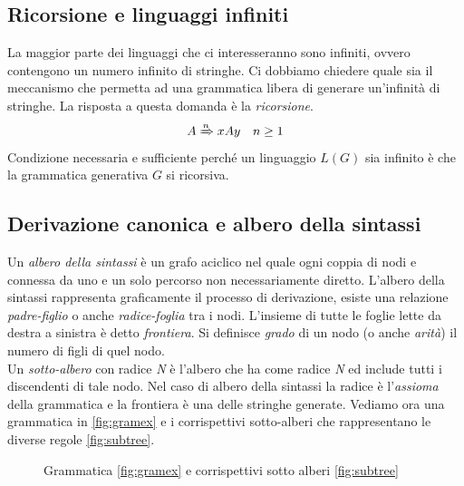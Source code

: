\subsection{Ricorsione e linguaggi infiniti}
La maggior parte dei linguaggi che ci interesseranno sono infiniti, ovvero contengono un numero infinito di stringhe. Ci dobbiamo chiedere quale sia il meccanismo che permetta ad una grammatica libera di generare un'infinità di stringhe. La risposta a questa domanda è la \emph{ricorsione}.
$$A\xRightarrow{n}xAy \quad n\geq 1$$
Condizione necessaria e sufficiente perché un linguaggio $ L(G) $ sia infinito è che la grammatica generativa $ G $ si ricorsiva.
\subsection{Derivazione canonica e albero della sintassi}
Un \emph{albero della sintassi} è un grafo aciclico nel quale ogni coppia di nodi e connessa da uno e un solo percorso non necessariamente diretto. L'albero della sintassi rappresenta graficamente il processo di derivazione, esiste una relazione \emph{padre-figlio} o anche \emph{radice-foglia} tra i nodi. L'insieme di tutte le foglie lette da destra a sinistra è detto \emph{frontiera}. Si definisce \emph{grado} di un nodo (o anche \emph{arità}) il numero di figli di quel nodo.\\
Un \emph{sotto-albero} con radice \emph{N} è l'albero che ha come radice \emph{N} ed include tutti i discendenti di tale nodo. Nel caso di albero della sintassi la radice è l'\emph{assioma} della grammatica e la frontiera è una delle stringhe generate.
Vediamo ora una grammatica in \figurename \ref{fig:gramex} e i corrispettivi sotto-alberi che rappresentano le diverse regole \figurename \ref{fig:subtree}.
\begin{figure}
	\centering
	\hspace{10mm}
	\caption{Grammatica \ref{fig:gramex} e corrispettivi sotto alberi \ref{fig:subtree}}
\end{figure}

